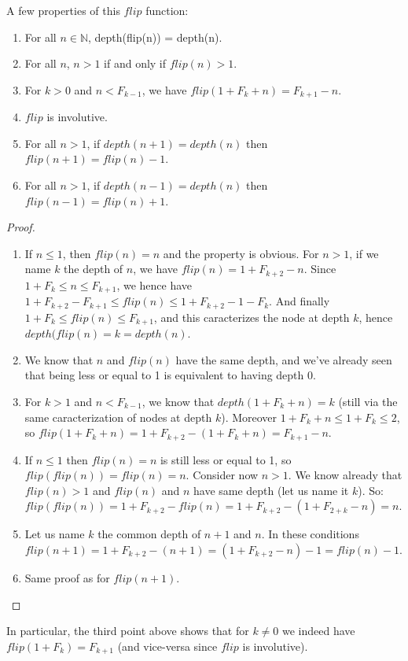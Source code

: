 \documentclass[a4paper,11pt]{article}
\begin{document}
A few properties of this $flip$ function:
\begin{theorem}\label{flipprops}
\noindent
\begin{enumerate}
\item For all $n\in\mathbb{N}$, depth(flip(n)) = depth(n).
\item For all $n$, $n>1$ if and only if $flip(n)>1$.
\item For $k>0$ and $n<F_{k-1}$, we have
 $flip(1+F_k+n) = F_{k+1}-n$.
\item $flip$ is involutive.
\item For all $n>1$, if $depth(n+1)=depth(n)$ then
  $flip(n+1)=flip(n)-1$.
\item For all $n>1$, if $depth(n-1)=depth(n)$ then
  $flip(n-1)=flip(n)+1$.
\end{enumerate}
\end{theorem}
\begin{proof}
\noindent
\begin{enumerate}
\item If $n\le 1$, then $flip(n)=n$ and the property is obvious.
For $n>1$, if we name $k$ the depth of $n$, we have
$flip(n) = 1+F_{k+2}-n$. Since $1+F_k \le n \le F_{k+1}$,
we hence have $1+F_{k+2}-F_{k+1} \le flip(n) \le 1+F_{k+2}-1-F_k$.
And finally $1+F_k \le flip(n) \le F_{k+1}$, and this caracterizes
the node at depth $k$, hence $depth(flip(n)=k=depth(n)$.
\item We know that $n$ and $flip(n)$ have the same depth, and
we've already seen that being less or equal to 1 is equivalent
to having depth 0.
\item For $k>1$ and $n<F_{k-1}$, we know that $depth(1+F_k+n)=k$
(still via the same caracterization of nodes at depth $k$).
Moreover $1+F_k+n \le 1+F_k \le 2$, so
$flip(1+F_k+n) = 1+F_{k+2}-(1+F_k+n) = F_{k+1}-n$.
\item If $n\le 1$ then $flip(n)=n$ is still less or equal to 1,
so $flip(flip(n))=flip(n)=n$.
Consider now $n>1$. We know already that $flip(n)>1$ and
$flip(n)$ and $n$ have same depth (let us name it $k$). So:
$flip(flip(n)) = 1+F_{k+2}-flip(n)=1+F_{k+2}-(1+F_{2+k}-n) = n$.
\item Let us name $k$ the common depth of $n+1$ and $n$.
In these conditions
$flip(n+1) = 1+F_{k+2}-(n+1) = (1+F_{k+2}-n)-1 = flip(n)-1$.
\item Same proof as for $flip(n+1)$.
\end{enumerate}
\end{proof}

In particular, the third point above shows that for $k\neq 0$
we indeed have $flip(1+F_k) = F_{k+1}$ (and vice-versa since $flip$
is involutive).
\end{document}
